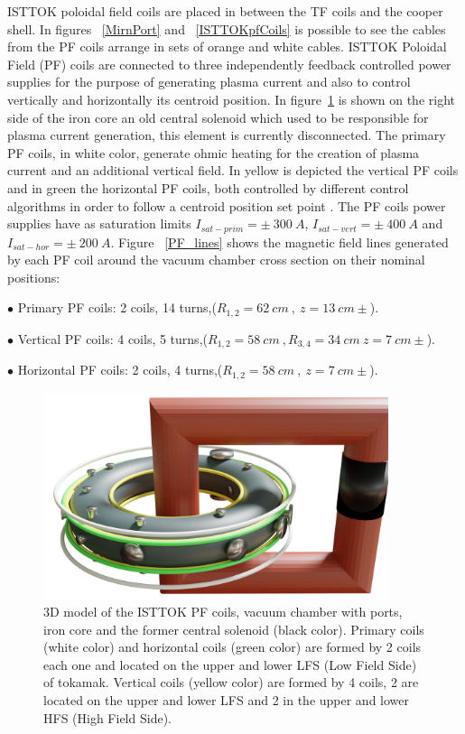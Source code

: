 ISTTOK poloidal field coils are placed in between the TF coils and the cooper shell. In figures ~\ref{MirnPort} and ~\ref{ISTTOKpfCoils} is possible to see the cables from the PF coils arrange in sets of orange and white cables. ISTTOK Poloidal Field (PF) coils are connected to three independently feedback controlled power supplies for the purpose of generating plasma current and also to control vertically and horizontally its centroid position. In figure~\ref{PF_coils} is shown on the right side of the iron core an  old central solenoid which used to be responsible for plasma current generation, this element is currently disconnected.  The primary PF coils, in white color, generate ohmic heating for the creation of plasma current and an additional vertical field. In yellow is depicted the vertical PF coils and in green the horizontal PF coils, both controlled by different control algorithms in order to follow a centroid position set point \cite{IvoPID}. The PF coils power supplies have as saturation limits $I_{sat-prim}=\pm~ 300~A$, $I_{sat-vert}=\pm~ 400~A$ and $I_{sat-hor}=\pm~ 200~A$. Figure ~\ref{PF_lines} shows the magnetic field lines generated by each PF coil around the vacuum chamber cross section on their nominal positions:\smallskip

$\bullet$ Primary PF coils: 2 coils, 14 turns,($R_{1,2}=62 ~cm~,~z=13 ~cm\pm$).
\smallskip

$\bullet$ Vertical PF coils: 4 coils, 5 turns,($R_{1,2}=58 ~cm~, R_{3,4}=34 ~cm ~z=7 ~cm\pm$).
\smallskip

$\bullet$ Horizontal PF coils: 2 coils, 4 turns,($R_{1,2}=58 ~cm~, ~z=7 ~cm\pm$).
\smallskip

\begin{figure}[htbp]
	\centering
	\includegraphics[width=0.9\textwidth]{Chp4/ist_coils.png}
	\caption{ 3D model of the ISTTOK PF coils, vacuum chamber with ports, iron core and the former central solenoid (black color). Primary coils (white color) and horizontal coils (green color) are formed by 2 coils each one and located on the  upper and lower LFS (Low Field Side) of tokamak. Vertical coils (yellow color) are formed by 4 coils, 2 are located on the upper and lower LFS and 2 in the upper and lower HFS (High Field Side). \label{PF_coils}  }
\end{figure}

